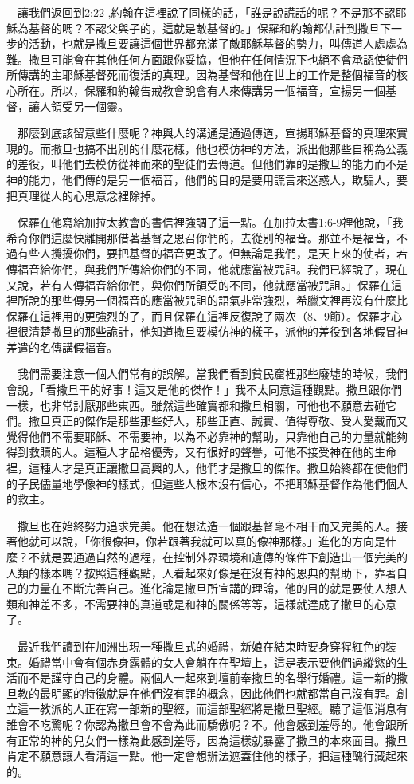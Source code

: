 \documentclass{book}
\begin{document}
　讓我們返回到2:22 ,約翰在這裡說了同樣的話，「誰是說謊話的呢？不是那不認耶穌為基督的嗎？不認父與子的，這就是敵基督的。」保羅和約翰都估計到撒旦下一步的活動，也就是撒旦要讓這個世界都充滿了敵耶穌基督的勢力，叫傳道人處處為難。撒旦可能會在其他任何方面跟你妥協，但他在任何情況下也絕不會承認使徒們所傳講的主耶穌基督死而復活的真理。因為基督和他在世上的工作是整個福音的核心所在。所以，保羅和約翰告戒教會說會有人來傳講另一個福音，宣揚另一個基督，讓人領受另一個靈。

　那麼到底該留意些什麼呢？神與人的溝通是通過傳道，宣揚耶穌基督的真理來實現的。而撒旦也搞不出別的什麼花樣，他也模仿神的方法，派出他那些自稱為公義的差役，叫他們去模仿從神而來的聖徒們去傳道。但他們靠的是撒旦的能力而不是神的能力，他們傳的是另一個福音，他們的目的是要用謊言來迷惑人，欺騙人，要把真理從人的心思意念裡除掉。

　保羅在他寫給加拉太教會的書信裡強調了這一點。在加拉太書1:6-9裡他說，「我希奇你們這麼快離開那借著基督之恩召你們的，去從別的福音。那並不是福音，不過有些人攪擾你們，要把基督的福音更改了。但無論是我們，是天上來的使者，若傳福音給你們，與我們所傳給你們的不同，他就應當被咒詛。我們已經說了，現在又說，若有人傳福音給你們，與你們所領受的不同，他就應當被咒詛。」保羅在這裡所說的那些傳另一個福音的應當被咒詛的語氣非常強烈，希臘文裡再沒有什麼比保羅在這裡用的更強烈的了，而且保羅在這裡反復說了兩次（8、9節）。保羅才心裡很清楚撒旦的那些詭計，他知道撒旦要模仿神的樣子，派他的差役到各地假冒神差遣的名傳講假福音。

　我們需要注意一個人們常有的誤解。當我們看到貧民窟裡那些廢墟的時候，我們會說，「看撒旦干的好事！這又是他的傑作！」我不太同意這種觀點。撒旦跟你們一樣，也非常討厭那些東西。雖然這些確實都和撒旦相關，可他也不願意去碰它們。撒旦真正的傑作是那些那些好人，那些正直、誠實、值得尊敬、受人愛戴而又覺得他們不需要耶穌、不需要神，以為不必靠神的幫助，只靠他自己的力量就能夠得到救贖的人。這種人才品格優秀，又有很好的聲譽，可他不接受神在他的生命裡，這種人才是真正讓撒旦高興的人，他們才是撒旦的傑作。撒旦始終都在使他們的子民儘量地學像神的樣式，但這些人根本沒有信心，不把耶穌基督作為他們個人的救主。

　撒旦也在始終努力追求完美。他在想法造一個跟基督毫不相干而又完美的人。接著他就可以說，「你很像神，你若跟著我就可以真的像神那樣。」進化的方向是什麼？不就是要通過自然的過程，在控制外界環境和遺傳的條件下創造出一個完美的人類的樣本嗎？按照這種觀點，人看起來好像是在沒有神的恩典的幫助下，靠著自己的力量在不斷完善自己。進化論是撒旦所宣講的理論，他的目的就是要使人想人類和神差不多，不需要神的真道或是和神的關係等等，這樣就達成了撒旦的心意了。

　最近我們讀到在加洲出現一種撒旦式的婚禮，新娘在結束時要身穿猩紅色的裝束。婚禮當中會有個赤身露體的女人會躺在在聖壇上，這是表示要他們過縱慾的生活而不是謹守自己的身體。兩個人一起來到壇前奉撒旦的名舉行婚禮。這一新的撒旦教的最明顯的特徵就是在他們沒有罪的概念，因此他們也就都當自己沒有罪。創立這一教派的人正在寫一部新的聖經，而這部聖經將是撒旦聖經。聽了這個消息有誰會不吃驚呢？你認為撒旦會不會為此而驕傲呢？不。他會感到羞辱的。他會跟所有正常的神的兒女們一樣為此感到羞辱，因為這樣就暴露了撒旦的本來面目。撒旦肯定不願意讓人看清這一點。他一定會想辦法遮蓋住他的樣子，把這種醜行藏起來的。
\end{document}
